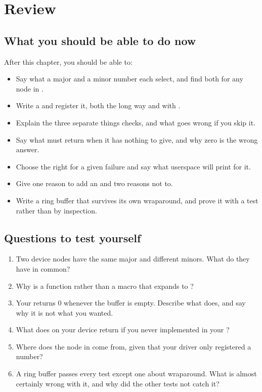 
\section{Review}
\label{c5:sec:review}

\subsection*{What you should be able to do now}
After this chapter, you should be able to:
\begin{itemize}
  \item Say what a major and a minor number each select, and find both for any node in .
  \item Write a  and register it, both the long way and with
    .
  \item Explain the three separate things  checks, and what goes wrong if you
    skip it.
  \item Say what  must return when it has nothing to give, and why zero is the wrong
    answer.
  \item Choose the right  for a given failure and say what userspace will print for it.
  \item Give one reason to add an  and two reasons not to.
  \item Write a ring buffer that survives its own wraparound, and prove it with a test rather than
    by inspection.
\end{itemize}

\subsection*{Questions to test yourself}
\begin{enumerate}
  \item Two device nodes have the same major and different minors. What do they have in common?
  \item Why is  a function rather than a macro that expands to ?
  \item Your  returns 0 whenever the buffer is empty. Describe what  does, and say why it is not what you wanted.
  \item What does  on your device return if you never implemented  in your
    ?
  \item Where does the node in  come from, given that your driver only registered a
    number?
  \item A ring buffer passes every test except one about wraparound. What is almost certainly wrong
    with it, and why did the other tests not catch it?
\end{enumerate}

